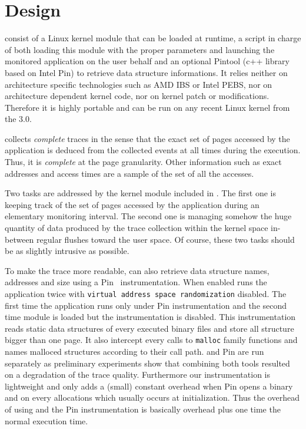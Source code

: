 \section{Design}
\label{sec:design}

\Moca consist of a Linux kernel module that can be loaded at runtime,  a script
in charge of both loading this module with the proper parameters and launching the
monitored application on the user behalf
and an optional Pintool (c++ library based on Intel Pin) to retrieve data
structure informations.
It relies neither on architecture specific
technologies such as AMD IBS or Intel PEBS, nor on architecture dependent kernel
code, nor on kernel patch or modifications.
Therefore it is highly portable and can be run on any recent Linux kernel
from the $3.0$.

\Moca collects \emph{complete} traces in the sense that the exact set
of pages accessed by the application is deduced from the collected events
at all times during the execution. Thus, it is \emph{complete} at the page granularity.
Other information such as exact addresses and access times are a sample of
the set of all the accesses.

Two tasks are addressed by the kernel module included in \Moca. The first one is
keeping track of the set of pages accessed by the application during an elementary monitoring
interval. The second one is managing somehow the huge quantity of data produced
by the trace collection within the kernel space in-between regular flushes toward
the user space. Of course, these two tasks should be as slightly intrusive as possible.

To make the trace more readable, \Moca can also retrieve data structure
names, addresses and size using a Pin~\cite{Luk05Pin}
instrumentation. When enabled \Moca runs the application twice with \texttt{virtual
address space randomization} disabled. The first time the application runs only
under Pin instrumentation and the second time \Moca module is loaded but the
instrumentation is disabled. This instrumentation reads static data
structures of every executed binary files and store all structure bigger than
one page. It also intercept every calls to \texttt{malloc} family functions
and names malloced structures according to their call path.
\Moca and Pin are run separately as preliminary experiments show that combining both
tools resulted on a degradation of the trace quality. Furthermore our
instrumentation is lightweight and only  adds a (small) constant overhead when
Pin opens a binary and on every allocations which usually occurs at
initialization. Thus the overhead of using \Moca and the Pin instrumentation
is basically \Moca overhead plus one time the normal execution time.


